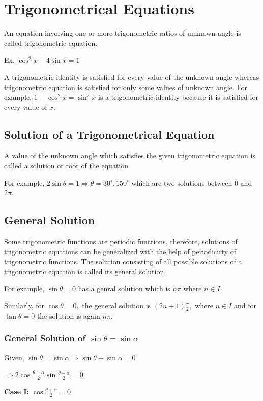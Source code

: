 \chapter{Trigonometrical Equations}
An equation involving one or more trigonometric ratios of unknown angle is called trigonometric equation.

Ex. $\cos^2x - 4\sin x = 1$

A trigonometric identity is satisfied for every value of the unknown angle whereas trigonometric equation is satisfied for
only some values of unknown angle. For example, $1 - \cos^2x = \sin^2x$ is a trigonometric identity because it is satisfied
for every value of $x.$

\section{Solution of a Trigonometrical Equation}
A value of the unknown angle which satisfies the given trigonometric equation is called a solution or root of the equation.

For example, $2\sin\theta = 1 \Rightarrow \theta = 30^\circ, 150^\circ$ which are two solutions between $0$ and
$2\pi.$

\section{General Solution}
Some trigonometric functions are periodic functions, therefore, solutions of trigonometric equations can be generalized with
the help of periodicirty of trigonometric functions. The solution consisting of all possible solutions of a trigonometric
equation is called its general solution.

For example, $\sin\theta = 0$ has a genral solution which is $n\pi$ where $n\in I.$

Similarly, for $\cos\theta = 0,$ the general solution is $(2n + 1)\frac{\pi}{2},$ where $n\in I$ and for
$\tan\theta = 0$ the solution is again $n\pi.$

\subsection{General Solution of $\sin\theta = \sin\alpha$}
Given, $\sin\theta = \sin\alpha \Rightarrow \sin\theta - \sin\alpha = 0$

$\Rightarrow 2\cos\frac{\theta + \alpha}{2}\sin\frac{\theta - \alpha}{2} = 0$

{\bf Case I:} $\cos\frac{\theta + \alpha}{2} = 0$

